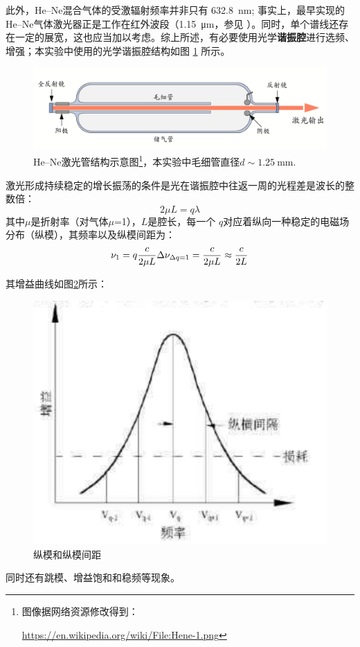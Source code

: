 \documentclass{buaaemp}
\begin{document}
	此外，He--Ne混合气体的受激辐射频率并非只有 \SI{632.8}{\nm}; 事实上，最早实现的He--Ne气体激光器正是工作在红外波段（\SI{1.15}{\um}，参见 \cite{javan1961population}）。同时，单个谱线还存在一定的展宽，这也应当加以考虑。综上所述，有必要使用光学\textbf{谐振腔}进行选频、增强；本实验中使用的光学谐振腔结构如图 \ref{fig:gasTube} 所示。
	\begin{figure}[!h]
	\centering
	\vspace{-.5\baselineskip}
	\includegraphics[width=.9\linewidth]{image/gasTube.png}
	\caption[\textup{He--Ne}激光管结构]{%
		\textup{He--Ne}激光管结构示意图\footnote{%
			图像据网络资源修改得到：\par
			\noindent%
			\url{https://en.wikipedia.org/wiki/File:Hene-1.png}%
		}，本实验中毛细管直径$d\sim\SI{1.25}{\mm}$. \vspace{1ex}
	}
	\label{fig:gasTube}
	\end{figure}


激光形成持续稳定的增长振荡的条件是光在谐振腔中往返一周的光程差是波长的整数倍：
\begin{equation}
    2 \mu L=q \lambda
\end{equation}
其中$\mu$是折射率（对气体$\mu$=1），$L$是腔长，每一个 $q$对应着纵向一种稳定的电磁场分布（纵模），其频率以及纵模间距为：
\begin{equation}
    \nu_1=q \frac{c}{2 \mu L} \\
    \Delta \nu_{\Delta q=1}=\frac{c}{2 \mu L} \approx \frac{c}{2L}
\end{equation}

其增益曲线如图\ref{fig:mode}所示：
\begin{figure}
    \centering
    \includegraphics[width=.9\linewidth]{image/fre.png}
    \caption{纵模和纵模间距}
    \label{fig:mode}
\end{figure}
同时还有跳模、增益饱和和稳频等现象。
\end{document}
